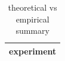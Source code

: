\begin{table}[h]
\centering
\begin{tabular}{|c|}
\hline
experiment \\ \hline
\hline
\end{tabular}
\caption{theoretical vs empirical summary}
\label{tab:T19}
\end{table}
